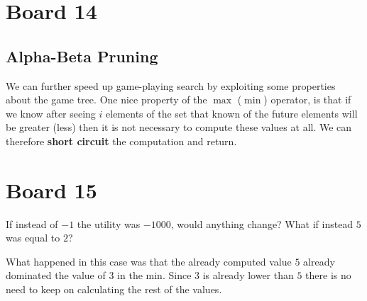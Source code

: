 \documentclass[11pt]{article}
\begin{document}
\section{Board 14}

\subsection{Alpha-Beta Pruning}

We can further speed up game-playing search by exploiting some properties about the game tree.  One nice property of the $\max$ ($\min$) operator, is that if we know after seeing $i$ elements of the set that known of the future elements will be greater (less) then it is not necessary to compute these values at all. We can therefore \textbf{short circuit} the computation and return.


\section{Board 15}
  \begin{exercise}
    If instead of $-1$ the utility was $-1000$, would anything change? What if instead $5$ was equal to $2$?
  \end{exercise}








What happened in this case was that the already computed value $5$ already dominated the value of $3$ in the min. Since $3$ is already lower than $5$ there is no need to keep on calculating the rest of the values. 
\end{document}
